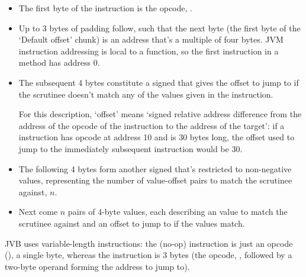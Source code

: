 \documentclass[dissertation.tex]{subfiles}
\begin{document}
{{{{                \begin{itemize}
                \item
                {
                    The first byte of the instruction is the opcode, .
                }
                \item
                {

                    Up to 3 bytes of padding follow, such that the next byte (the first byte of the `Default offset'
                    chunk) is an address that's a multiple of four bytes. JVM instruction addressing is local to a
                    function, so the first instruction in a method has address 0.

                }
                \item
                {

                    The subsequent 4 bytes constitute a signed  that gives the offset to jump to if the
                    scrutinee doesn't match any of the values given in the instruction.

                    For this description, `offset' means `signed relative address difference from the address of the
                    opcode of the instruction to the address of the target': if a  instruction
                    has opcode at address 10 and is 30 bytes long, the offset used to jump to the immediately subsequent
                    instruction would be 30.

                }
                \item
                {

                    The following 4 bytes form another signed  that's restricted to non-negative values,
                    representing the number of value-offset pairs to match the scrutinee against, \(n\).

                }
                \item
                {

                    Next come \(n\) pairs of 4-byte values, each describing an  value to match the scrutinee
                    against and an offset to jump to if the values match.

                }
                \end{itemize}

                JVB uses variable-length instructions: the  (no-op) instruction is just an opcode
                (), a single byte, whereas the  instruction is 3 bytes (the opcode,
                , followed by a two-byte operand forming the address to jump to).

}}}}
\end{document}
